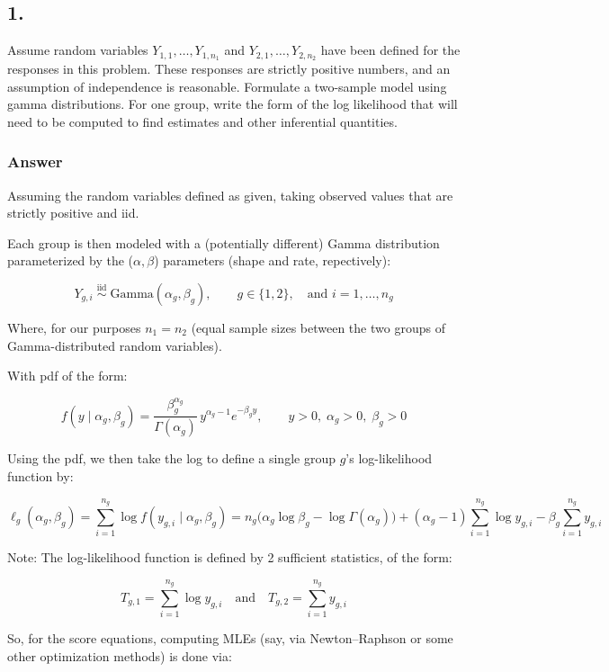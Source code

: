 \documentclass[
]{article}
\begin{document}
\newpage

\subsection{1.}\label{section}

Assume random variables \(Y_{1,1}, \ldots, Y_{1,n_1}\) and
\(Y_{2,1}, \ldots, Y_{2,n_2}\) have been defined for the responses in
this problem. These responses are strictly positive numbers, and an
assumption of independence is reasonable. Formulate a two-sample model
using gamma distributions. For one group, write the form of the log
likelihood that will need to be computed to find estimates and other
inferential quantities.

\subsubsection{Answer}\label{answer}

Assuming the random variables defined as given, taking observed values
that are strictly positive and iid.

Each group is then modeled with a (potentially different) Gamma
distribution parameterized by the (\(\alpha, \beta\)) parameters (shape
and rate, repectively):

\[
Y_{g,i}\;\stackrel{\text{iid}}{\sim}\;\mathrm{Gamma}(\alpha_g,\beta_g), \qquad g\in\{1,2\},\quad \text{and } i=1,\dots,n_g
\]

Where, for our purposes \(n_{1} = n_{2}\) (equal sample sizes between
the two groups of Gamma-distributed random variables).

With pdf of the form:

\[
f(y\mid \alpha_g,\beta_g)=\frac{\beta_g^{\alpha_g}}{\Gamma(\alpha_g)}\,y^{\alpha_g-1}e^{-\beta_g y},\qquad y>0,\;\alpha_g>0,\;\beta_g>0
\]

Using the pdf, we then take the log to define a single group \(g\)'s
log-likelihood function by:

\[
\ell_g(\alpha_g,\beta_g)
= \sum_{i=1}^{n_g}\log f(y_{g,i}\mid \alpha_g,\beta_g)
= n_g\Big(\alpha_g\log\beta_g-\log\Gamma(\alpha_g)\Big)
+(\alpha_g-1)\sum_{i=1}^{n_g}\log y_{g,i}
-\beta_g\sum_{i=1}^{n_g} y_{g,i}
\]

Note: The log-likelihood function is defined by 2 sufficient statistics,
of the form:

\[
T_{g,1}=\sum_{i=1}^{n_g}\log y_{g,i}
\quad\text{and}\quad
T_{g,2}=\sum_{i=1}^{n_g} y_{g,i}
\]

So, for the score equations, computing MLEs (say, via Newton--Raphson or
some other optimization methods) is done via:
\end{document}
